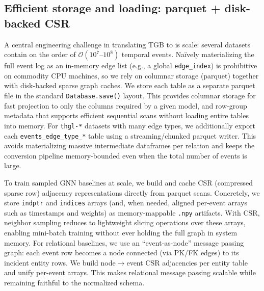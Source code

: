 \subsection{Efficient storage and loading: parquet + disk-backed CSR} \label{sec:tgb_parquet_csr}

  A central engineering challenge in translating TGB to \relbench is scale: several datasets contain on the order of \(\mathcal{O}(10^7\text{--}10^8)\) temporal events. Na\"ively materializing the full event log as an in-memory edge list (e.g., a global
  \texttt{edge\_index}) is prohibitive on commodity CPU machines, so we rely on columnar storage (parquet) together with disk-backed sparse graph caches. We store each table as a separate parquet file in the standard \relbench \texttt{Database.save()} layout. This provides columnar storage for fast projection to only the columns required by a given model, and row-group metadata that supports efficient
  sequential scans without loading entire tables into memory. For \texttt{thgl-*} datasets with many edge types, we additionally export each \texttt{events\_edge\_type\_*} table using a streaming/chunked parquet writer. This avoids materializing massive
  intermediate dataframes per relation and keeps the conversion pipeline memory-bounded even when the total number of events is large.

  To train sampled GNN baselines at scale, we build and cache CSR (compressed sparse row) adjacency representations directly from parquet scans. Concretely, we store \texttt{indptr} and \texttt{indices} arrays (and, when needed, aligned per-event arrays
  such as timestamps and weights) as memory-mappable \texttt{.npy} artifacts. With CSR, neighbor sampling reduces to lightweight slicing operations over these arrays, enabling mini-batch training without ever holding the full graph in system memory. For relational baselines, we use an ``event-as-node'' message passing graph: each event row becomes a node connected (via PK/FK edges) to its incident entity rows. We build node$\rightarrow$event CSR adjacencies per entity table and unify per-event arrays. This makes relational message passing scalable while remaining faithful to the normalized schema.

